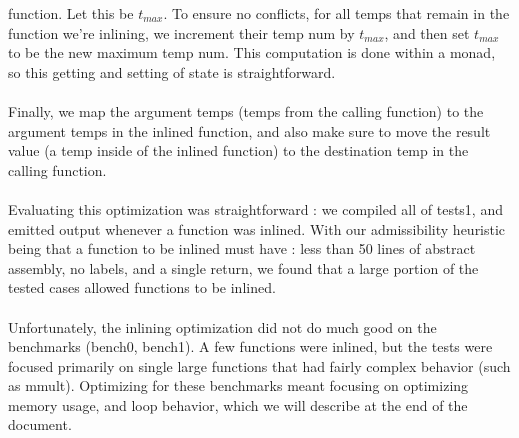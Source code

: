 \documentclass[11pt]{article}
\begin{document}
function. Let this be $t_{max}$. To ensure no conflicts, for all temps that remain in the function we're
inlining, we increment their temp num by $t_{max}$, and then set $t_{max}$ to be the new maximum temp num.
This computation is done within a monad, so this getting and setting of state is straightforward.\\
\\
Finally,
we map the argument temps (temps from the calling function) to the argument temps in the inlined function,
and also make sure to move the result value (a temp inside of the inlined function) to the destination temp
in the calling function. \\
\\
Evaluating this optimization was straightforward : we compiled all of tests1, and emitted output whenever
a function was inlined. With our admissibility heuristic being that a function to be inlined must have :
less than 50 lines of abstract assembly, no labels, and a single return, we found that a large portion
of the tested cases allowed functions to be inlined.\\
\\
Unfortunately, the inlining optimization did not do much good on the benchmarks (bench0, bench1). A few
functions were inlined, but the tests were focused primarily on single large functions that had fairly
complex behavior (such as mmult). Optimizing for these benchmarks meant focusing on optimizing memory
usage, and loop behavior, which we will describe at the end of the document.
\end{document}
